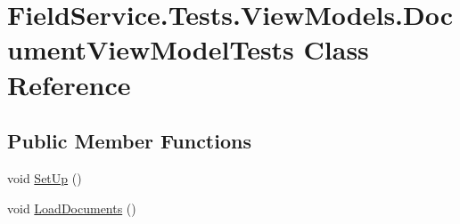 \hypertarget{class_field_service_1_1_tests_1_1_view_models_1_1_document_view_model_tests}{\section{Field\+Service.\+Tests.\+View\+Models.\+Document\+View\+Model\+Tests Class Reference}
\label{class_field_service_1_1_tests_1_1_view_models_1_1_document_view_model_tests}
}
\subsection*{Public Member Functions}
\begin{DoxyCompactItemize}
\item 
void \hyperlink{class_field_service_1_1_tests_1_1_view_models_1_1_document_view_model_tests_a7e782ed659f643fbba48cd081033b4d4}{Set\+Up} ()
\item 
void \hyperlink{class_field_service_1_1_tests_1_1_view_models_1_1_document_view_model_tests_a64671b44fd23a55be3c9253874965539}{Load\+Documents} ()
\end{DoxyCompactItemize}


